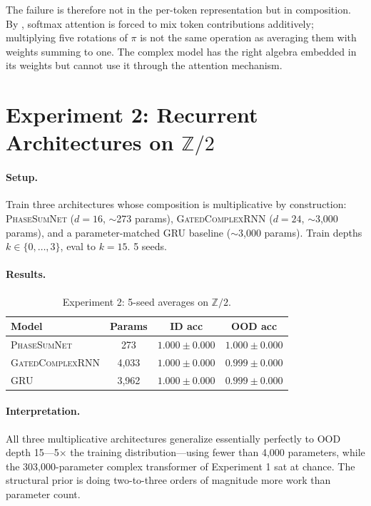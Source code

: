 \documentclass[11pt]{article}
\theoremstyle{definition}
\newcommand{\Z}{\mathbb{Z}}
\begin{document}
The failure is therefore not in the per-token representation but
in composition. By
, softmax
attention is forced to mix token contributions additively; multiplying
five rotations of $\pi$ is not the same operation as averaging them
with weights summing to one. The complex model has the right algebra
embedded in its weights but cannot use it through the attention
mechanism.


\section{Experiment 2: Recurrent Architectures on $\Z/2$}
\label{sec:exp2}

\paragraph{Setup.} Train three architectures whose composition is
multiplicative by construction: \textsc{PhaseSumNet} ($d=16$, $\sim$273
params), \textsc{GatedComplexRNN} ($d=24$, $\sim$3{,}000 params), and a
parameter-matched GRU baseline ($\sim$3{,}000 params). Train depths
$k \in \{0,\ldots,3\}$, eval to $k=15$. 5 seeds.

\paragraph{Results.}

\begin{table}[h]
\centering
\caption{Experiment 2: 5-seed averages on $\Z/2$.}
\label{tab:exp2-results}
\begin{tabular}{lccc}
\toprule
Model & Params & ID acc & OOD acc \\
\midrule
\textsc{PhaseSumNet}     & 273   & $1.000 \pm 0.000$ & $1.000 \pm 0.000$ \\
\textsc{GatedComplexRNN} & 4{,}033 & $1.000 \pm 0.000$ & $0.999 \pm 0.000$ \\
\textsc{GRU}             & 3{,}962 & $1.000 \pm 0.000$ & $0.999 \pm 0.000$ \\
\bottomrule
\end{tabular}
\end{table}

\paragraph{Interpretation.} All three multiplicative architectures
generalize essentially perfectly to OOD depth 15---5$\times$ the
training distribution---using fewer than 4{,}000 parameters, while
the 303{,}000-parameter complex transformer of Experiment 1 sat at
chance. The structural prior is doing two-to-three orders of magnitude
more work than parameter count.
\end{document}

